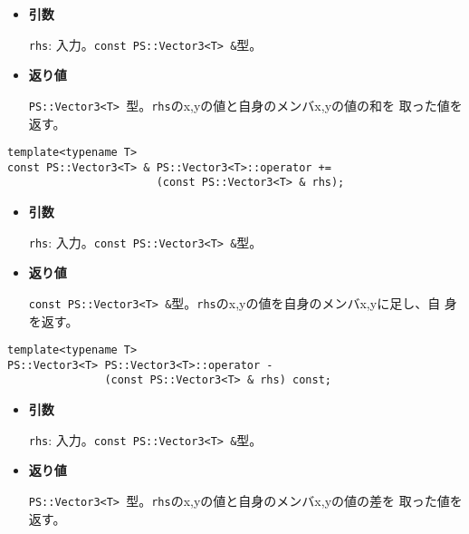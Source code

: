 \begin{itemize}

\item{{\bf 引数}}

{\tt rhs}: 入力。{\tt const PS::Vector3<T> \&}型。

\item{{\bf 返り値}}

{\tt PS::Vector3<T> }型。{\tt rhs}のx,yの値と自身のメンバx,yの値の和を
取った値を返す。

\end{itemize}


\begin{screen}
\begin{verbatim}
template<typename T>
const PS::Vector3<T> & PS::Vector3<T>::operator += 
                       (const PS::Vector3<T> & rhs);
\end{verbatim}
\end{screen}

\begin{itemize}

\item{{\bf 引数}}

{\tt rhs}: 入力。{\tt const PS::Vector3<T> \&}型。

\item{{\bf 返り値}}

{\tt const PS::Vector3<T> \&}型。{\tt rhs}のx,yの値を自身のメンバx,yに足し、自
身を返す。

\end{itemize}


\begin{screen}
\begin{verbatim}
template<typename T>
PS::Vector3<T> PS::Vector3<T>::operator - 
               (const PS::Vector3<T> & rhs) const;
\end{verbatim}
\end{screen}

\begin{itemize}

\item{{\bf 引数}}

{\tt rhs}: 入力。{\tt const PS::Vector3<T> \&}型。

\item{{\bf 返り値}}

{\tt PS::Vector3<T> }型。{\tt rhs}のx,yの値と自身のメンバx,yの値の差を
取った値を返す。

\end{itemize}


